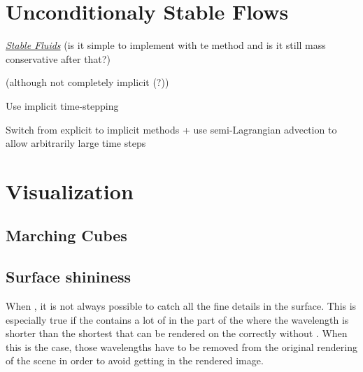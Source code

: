 \section{Unconditionaly Stable Flows}

\textit{\href{http://www.dgp.toronto.edu/people/stam/reality/Research/pdf/ns.pdf}{Stable Fluids}} (is it simple to implement with te \VOF method and is it still mass conservative after that?)

\SIMPLE (although not completely implicit (?))

Use implicit time-stepping

Switch from explicit to implicit methods + use semi-Lagrangian advection to allow arbitrarily large time steps

\section{Visualization}

\subsection{Marching Cubes}

\subsection{Surface shininess}

When \rendering {}, it is not always possible to catch all the fine details in the surface. This is especially true if the  contains a lot of \energy in the part of the  where the wavelength is shorter than the shortest \wavelength that can be rendered on the  correctly without \folding. When this is the case, those wavelengths have to be removed from the original rendering of the scene in order to avoid getting  in the rendered image.




